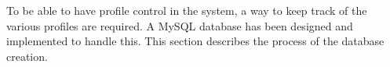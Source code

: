To be able to have profile control in the system, a way to keep track of the various profiles are required. A MySQL database has been designed and implemented to handle this. This section describes the process of the database creation.